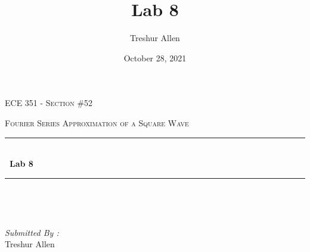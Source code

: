\documentclass[12pt]{report}
\title{Lab 8}
\author{ Treshur Allen}
\date{October 28, 2021}
\begin{document}

\begin{titlepage}
	\centering
    \vspace*{0.5 cm}
\begin{center}    \textsc{\Large   ECE 351 - Section \#52 }\\[2.0 cm]	\end{center}%
	\textsc{\Large Fourier Series Approximation of a Square Wave  }\\[0.5 cm]				%
	\rule{\linewidth}{0.2 mm} \\[0.4 cm]
	{ \huge \bfseries \ Lab 8}\\
	\rule{\linewidth}{0.2 mm} \\[1.5 cm]
	
	\begin{minipage}{0.4\textwidth}
		\begin{flushleft} \large
			\end{flushleft}
			\end{minipage}~
			\begin{minipage}{0.4\textwidth}
            
			\begin{flushright} \large
			\emph{Submitted By :} \\
			Treshur Allen  
		\end{flushright}
           
	\end{minipage}\\[2 cm]
	
    
    
    
    
	
\end{titlepage}


\tableofcontents
\pagebreak

\renewcommand{\thesection}{\arabic{section}}
\end{document}
